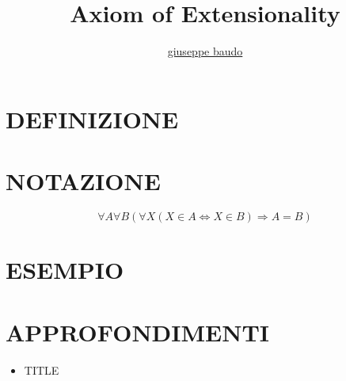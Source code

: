 \documentclass[a4paper,10pt]{article}
\title{Axiom of Extensionality}
\author{\href{http://www.baudo.hol.es}{giuseppe baudo}}
\begin{document}
\maketitle

\section{DEFINIZIONE}

\section{NOTAZIONE}
\[
  \forall A \forall B (\forall X (X \in A \Leftrightarrow X \in B ) \Rightarrow A = B)
\]
\section{ESEMPIO}

\section{APPROFONDIMENTI}
\begin{itemize}
 \item TITLE
\end{itemize}
\end{document}
